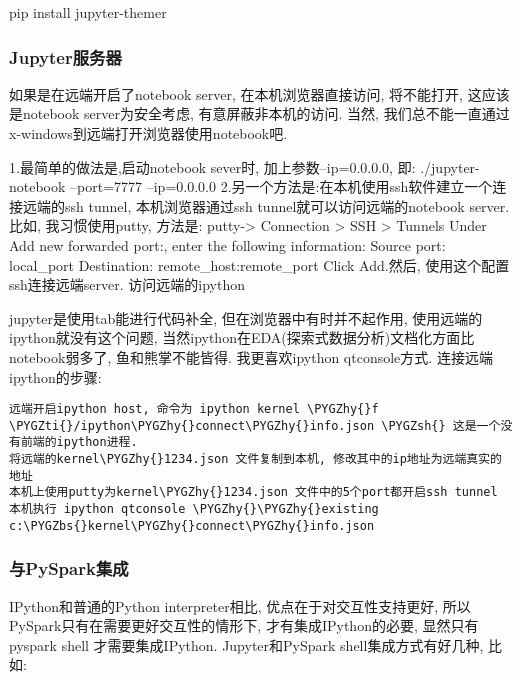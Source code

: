 \documentclass[letterpaper,10pt,english]{sphinxmanual}
\def\PYGZbs{\char`\\}
\def\PYGZsh{\char`\#}
\def\PYGZhy{\char`\-}
\def\PYGZti{\char`\~}
\begin{document}
pip install jupyter-themer


\subsubsection{Jupyter服务器}
\label{jupyter/jupyter_quickstart:Jupyter_u670d_u52a1_u5668}
如果是在远端开启了notebook server, 在本机浏览器直接访问, 将不能打开,
这应该是notebook server为安全考虑, 有意屏蔽非本机的访问. 当然,
我们总不能一直通过x-windows到远端打开浏览器使用notebook吧.

1.最简单的做法是,启动notebook sever时, 加上参数--ip=0.0.0.0, 即:
./jupyter-notebook --port=7777 --ip=0.0.0.0
2.另一个方法是:在本机使用ssh软件建立一个连接远端的ssh tunnel,
本机浏览器通过ssh tunnel就可以访问远端的notebook server. 比如,
我习惯使用putty, 方法是: putty-\textgreater{} Connection \textgreater{} SSH \textgreater{} Tunnels Under Add
new forwarded port:, enter the following information: Source port:
local\_port Destination: remote\_host:remote\_port Click Add.然后,
使用这个配置ssh连接远端server. 访问远端的ipython

jupyter是使用tab能进行代码补全, 但在浏览器中有时并不起作用,
使用远端的ipython就没有这个问题,
当然ipython在EDA(探索式数据分析)文档化方面比notebook弱多了,
鱼和熊掌不能皆得. 我更喜欢ipython qtconsole方式. 连接远端ipython的步骤:

\begin{Verbatim}[commandchars=\\\{\}]
远端开启ipython host, 命令为 ipython kernel \PYGZhy{}f \PYGZti{}/ipython\PYGZhy{}connect\PYGZhy{}info.json \PYGZsh{} 这是一个没有前端的ipython进程.
将远端的kernel\PYGZhy{}1234.json 文件复制到本机, 修改其中的ip地址为远端真实的地址
本机上使用putty为kernel\PYGZhy{}1234.json 文件中的5个port都开启ssh tunnel
本机执行 ipython qtconsole \PYGZhy{}\PYGZhy{}existing c:\PYGZbs{}kernel\PYGZhy{}connect\PYGZhy{}info.json
\end{Verbatim}


\subsubsection{与PySpark集成}
\label{jupyter/jupyter_quickstart:_u4e0ePySpark_u96c6_u6210}
IPython和普通的Python interpreter相比, 优点在于对交互性支持更好,
所以PySpark只有在需要更好交互性的情形下, 才有集成IPython的必要, 显然只有
pyspark shell 才需要集成IPython. Jupyter和PySpark shell集成方式有好几种,
比如:
\end{document}

